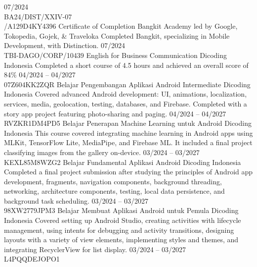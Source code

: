 \documentclass[9pt]{developercv} %
\begin{document}
\vspace{-1 pt}
\begin{entrylist}
	\entry
	{07/2024
		\\\footnotesize{BA24/DIST/XXIV-07\\/A129D4KY4396}}
	{Certificate of Completion}
	{Bangkit Academy led by Google, Tokopedia, Gojek, \& Traveloka}
	{Completed Bangkit, specializing in Mobile Development, with Distinction.}
	\entry
	{07/2024
		\\\footnotesize{TBI-DAGO/CORP/10439}}
	{English for Business Communication}
	{Dicoding Indonesia}
	{Completed a short course of 4.5 hours and achieved an overall score of 84\%}
	\entry
	{04/2024 -- 04/2027
		\\\footnotesize{07Z604KK2ZQR}}
	{Belajar Pengembangan Aplikasi Android Intermediate}
	{Dicoding Indonesia}
	{Covered advanced Android development: UI, animations, localization, services, media, geolocation, testing, databases, and Firebase. Completed with a story app project featuring photo-sharing and paging.}
	\entry
	{04/2024 -- 04/2027
		\\\footnotesize{RVZKR1DM4PD5}}
	{Belajar Penerapan Machine Learning untuk Android}
	{Dicoding Indonesia}
	{This course covered integrating machine learning in Android apps using MLKit, TensorFlow Lite, MediaPipe, and Firebase ML. It included a final project classifying images from the gallery on-device.}
	\entry
	{03/2024 -- 03/2027
		\\\footnotesize{KEXL85M8WZG2}}
	{Belajar Fundamental Aplikasi Android}
	{Dicoding Indonesia}
	{Completed a final project submission after studying the principles of Android app development, fragments, navigation components, background threading, networking, architecture components, testing, local data persistence, and background task scheduling.}
	\entry
	{03/2024 -- 03/2027
		\\\footnotesize{98XW2779JPM3}}
	{Belajar Membuat Aplikasi Android untuk Pemula}
	{Dicoding Indonesia}
	{Covered setting up Android Studio, creating activities with lifecycle management, using intents for debugging and activity transitions, designing layouts with a variety of view elements, implementing styles and themes, and integrating RecyclerView for list display.}
	\entry
	{03/2024 -- 03/2027
		\\\footnotesize{L4PQQDEJOPO1}}

\end{entrylist}
\end{document}

